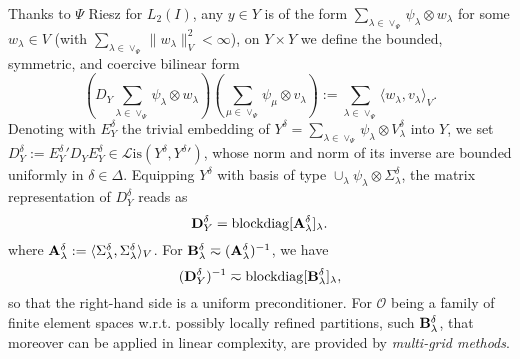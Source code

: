 \documentclass{amsart}
\theoremstyle{definition}
\theoremstyle{remark}
\numberwithin{equation}{section}
\newcommand{\cL}{\mathcal L}
\newcommand{\Lis}{\cL\mathrm{is}}
\DeclareMathOperator{\blockdiag}{blockdiag}
\newcommand{\rem}[1]{{\color{blue}{[#1]}}}
\newcommand{\1}{\mathbb 1}
\begin{document}
Thanks to $\Psi$ Riesz for $L_2(I)$,  any $y \in Y$ is of the form $\sum_{\lambda \in \vee_\Psi} \psi_\lambda \otimes w_\lambda$ for some $w_\lambda \in V$ (with $\sum_{\lambda \in \vee_\Psi} \|w_\lambda\|_V^2<\infty$), on $Y \times Y$ we define the bounded, symmetric, and coercive bilinear form
$$
(D_Y \sum_{\lambda \in \vee_\Psi} \psi_\lambda \otimes w_\lambda)(\sum_{\mu \in \vee_\Psi} \psi_\mu \otimes v_\lambda):=\sum_{\lambda \in \vee_\Psi} \langle w_\lambda, v_\lambda\rangle_V.
$$
Denoting with $E_Y^\delta$ the trivial embedding of $Y^\delta=\sum_{\lambda\in \vee_\Psi} \psi_\lambda \otimes V_\lambda^\delta$ into $Y$, we set $D_Y^\delta:={E_Y^\delta}' D_Y E_Y^\delta\in \Lis(Y^\delta,{Y^\delta}')$, whose norm and norm of its inverse are bounded uniformly in $\delta \in \Delta$.
Equipping $Y^\delta$ with basis of type $\cup_{\lambda} \psi_\lambda \otimes \Sigma_\lambda^\delta$, the matrix representation of $D_Y^\delta$ reads as
$$
{\bf D}_Y^\delta=\blockdiag[{\bf A}_\lambda^\delta]_{\lambda}.
$$
where ${\bf A}_\lambda^\delta:=\langle \Sigma_\lambda^\delta, \Sigma_\lambda^\delta\rangle_V$.
For ${\bf B}_\lambda^\delta \eqsim ({\bf A}_\lambda^\delta)^{-1}$, we have
$$
({\bf D}_Y^\delta)^{-1}\eqsim \blockdiag[{\bf B}_\lambda^\delta]_{\lambda},
$$
so that the right-hand side is a uniform preconditioner.
For ${\mathcal O}$ being a family of finite element spaces w.r.t. possibly locally refined partitions, such ${\bf B}_\lambda^\delta$, that moreover can be applied in linear complexity, are provided by \emph{multi-grid methods}.

\rem{Om te beginnen ${\bf B}_\lambda^\delta = ({\bf A}_\lambda^\delta)^{-1}$ nemen, d.w.z. directe solver in spatial direction.}
\end{document}
